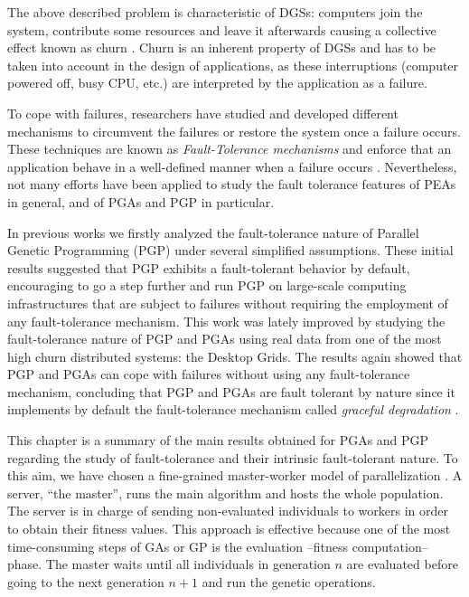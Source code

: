 \documentclass[graybox]{sty/svmult}
\begin{document}
The above described problem is characteristic of DGSs: computers join the system, contribute some resources and leave it afterwards causing a collective effect known as churn \cite{Stutzbach06Understanding}.
Churn is an inherent property of DGSs and has to be taken into 
account in the design of applications, as these interruptions (computer powered off, busy CPU, etc.) are interpreted by the application as a failure.   

To cope with failures, researchers have studied and developed different mechanisms to circumvent the failures or restore the
system once a failure occurs. These techniques are known as \emph{Fault-Tolerance mechanisms} and enforce that an
application behave in a well-defined manner when a failure occurs \cite{fault-tolerant-async}.
Nevertheless, not many efforts have been applied to study the fault
tolerance features of PEAs in general, and of PGAs and PGP in particular. 

In previous works \cite{cec-2007,gecco-2007-island-model} we firstly analyzed the fault-tolerance nature of Parallel Genetic
Programming (PGP) under several simplified assumptions. These initial results suggested that PGP exhibits a fault-tolerant behavior by
default, encouraging to go a step further and run PGP on large-scale computing infrastructures that are subject to failures
without requiring the employment of any fault-tolerance mechanism. This work was lately improved \cite{bads-2009, jfgcs-2010,
evocop-2010} by studying the fault-tolerance
nature of PGP and PGAs using real data from one of the most high churn
distributed systems: the Desktop Grids. The results again showed that PGP and PGAs can cope
with failures without using any fault-tolerance mechanism, concluding
that PGP and PGAs are fault tolerant by nature since it implements by default
the fault-tolerance mechanism called \emph{graceful degradation}
\cite{distributed-systems}. 

This chapter is a summary of the main results obtained for PGAs and PGP regarding the study of fault-tolerance and their intrinsic fault-tolerant nature.
To this aim, we have chosen a fine-grained master-worker model of parallelization \cite{spatially-structured-EAs}. A server, ``the master'', runs the
main algorithm and hosts the whole population. The server is in charge of sending non-evaluated individuals to workers in
order to obtain their fitness values. This approach is effective because one of the most time-consuming steps of GAs or
GP is the evaluation --fitness computation-- phase. The master waits until all individuals in generation $n$ are evaluated before
going to the next generation $n+1$ and run the genetic operations. 
\end{document}
